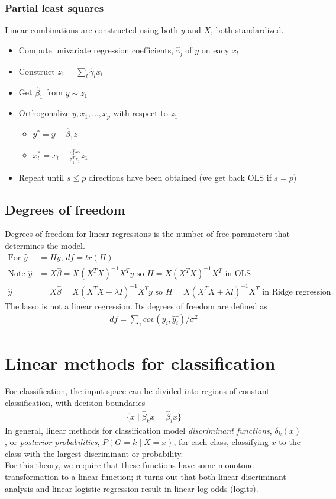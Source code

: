 \documentclass{article}
\begin{document}
\subsubsection{Partial least squares}
Linear combinations are constructed using both $y$ and $X$, both standardized. 
\begin{itemize}
  \item Compute univariate regression coefficients, $\hat{\gamma}_l$ of $y$ on eacy $x_l$
  \item Construct $z_1 = \sum_l\hat{\gamma}_lx_l$
  \item Get $\hat{\beta}_1$ from $y \sim z_1$
  \item Orthogonalize $y, x_1, \dots, x_p$ with respect to $z_1$
  \begin{itemize}
    \item $y^* = y - \hat{\beta}_1z_1$
    \item $x^*_l = x_l - \frac{z_1^Tx_l}{z_1^Tz_1}z_1$
  \end{itemize}
  \item Repeat until $s \leq p$ directions have been obtained (we get back OLS if $s = p$)
\end{itemize}

\subsection{Degrees of freedom}
Degrees of freedom for linear regressions is the number of free parameters that determines the model. 
\begin{align*}
  \textrm{For } \hat{y} &= Hy \textrm{, } df = tr(H)\\
  \textrm{Note } \hat{y} &= X\hat{\beta} = X(X^TX)^{-1}X^Ty \textrm{ so } H = X(X^TX)^{-1}X^T \textrm{ in OLS}\\
  \hat{y} &= X\hat{\beta} = X(X^TX + \lambda I)^{-1}X^Ty \textrm{ so } H = X(X^TX + \lambda I)^{-1}X^T \textrm{ in Ridge regression}
\end{align*}
The lasso is not a linear regression. Its degrees of freedom are defined as
\begin{align*}
  df = \sum_i cov(y_i, \hat{y_i}) / \sigma^2
\end{align*}


\section{Linear methods for classification}
For classification, the input space can be divided into regions of constant classification, with decision boundaries
\begin{align*}
  \{ x \mid \hat{\beta}_kx = \hat{\beta}_lx \}
\end{align*}
In general, linear methods for classification model \textit{discriminant functions}, $\delta_k(x)$, or \textit{posterior probabilities}, $P(G=k \mid X=x)$, for each class, classifying $x$ to the class with the largest discriminant or probability.\\
For this theory, we require that these functions have some monotone transformation to a linear function; it turns out that both linear discriminant analysis and linear logistic regression result in linear log-odds (logits).
\end{document}
